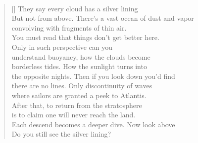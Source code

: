 \documentclass{book}
\begin{document}
\poemtitle{\textcolor[RGB]{165,15,15}{Silver lining}}
\hspace*{\fill} \\
\settowidth{\versewidth}{But not from above. There's a vast ocean of dust and vapor}
\begin{verse}[\versewidth]
    They say every cloud has a silver lining\\
    But not from above. There's a vast ocean of dust and vapor\\
    convolving with fragments of thin air.\\
    You must read that things don't get better here.\\
    Only in such perspective can you\\
    understand buoyancy, how the clouds become\\
    borderless tides. How the sunlight turns into\\
    the opposite nights. Then if you look down you'd find\\
    there are no lines. Only discontinuity of waves\\
    where sailors are granted a peek to Atlantis.\\
    After that, to return from the stratosphere\\
    is to claim one will never reach the land. \\
    Each descend becomes a deeper dive. Now look above\\
    Do you still see the silver lining?\\
\end{verse}

\newpage
\end{document}
